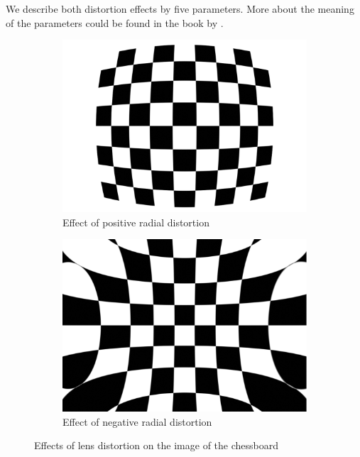 We describe both distortion effects by five parameters. More about the meaning
of the parameters could be found in the book by \citet*{bradski2008learning}.

\begin{figure}
	\begin{subfigure}[b]{0.48\linewidth}
		\includegraphics[width=\linewidth]{img/chessboard/7x8chessboard-positivedistortion}
		\caption{Effect of positive radial distortion}
	\end{subfigure}
	\begin{subfigure}[b]{0.48\linewidth}
		\includegraphics[width=\linewidth]{img/chessboard/7x8chessboard-negativedistortion}
		\caption{Effect of negative radial distortion}
	\end{subfigure}
	\caption{Effects of lens distortion on the image of the chessboard}
	\label{fig:distortion}
\end{figure}

